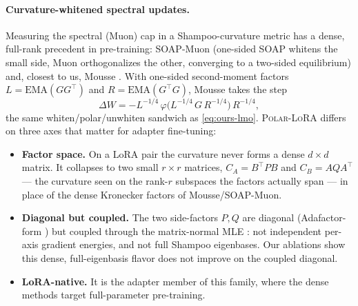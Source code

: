 \documentclass[11pt]{article}
\newcommand{\DW}{\Delta W}
\newcommand{\polar}{\varphi}                 %
\newcommand{\methodname}{\textsc{Polar-LoRA}\xspace}
\theoremstyle{plain}
\theoremstyle{definition}
\theoremstyle{remark}
\begin{document}
\paragraph{Curvature-whitened spectral updates.} Measuring the spectral (Muon) cap in a Shampoo-curvature metric has a dense, full-rank precedent in pre-training: SOAP-Muon \cite{soapmuon} (one-sided SOAP whitens the small side, Muon orthogonalizes the other, converging to a two-sided equilibrium) and, closest to us, Mousse \cite{mousse}. With one-sided second-moment factors $L=\mathrm{EMA}(GG^\top)$ and $R=\mathrm{EMA}(G^\top G)$, Mousse takes the step
\begin{equation*}
  \DW=-L^{-1/4}\,\polar\!\big(L^{-1/4}\,G\,R^{-1/4}\big)\,R^{-1/4},
\end{equation*}
the same whiten/polar/unwhiten sandwich as \eqref{eq:ours-lmo}. \methodname{} differs on three axes that matter for adapter fine-tuning:
\begin{itemize}[leftmargin=1.5em,itemsep=1pt,topsep=2pt]
  \item \textbf{Factor space.} On a LoRA pair the curvature never forms a dense $d\times d$ matrix. It collapses to two small $r\times r$ matrices, $C_A=B^\top PB$ and $C_B=AQA^\top$ --- the curvature seen on the rank-$r$ subspaces the factors actually span --- in place of the dense Kronecker factors of Mousse/SOAP-Muon.
  \item \textbf{Diagonal but coupled.} The two side-factors $P,Q$ are diagonal (Adafactor-form \cite{adafactor}) but coupled through the matrix-normal MLE \cite{klshampoo}: not independent per-axis gradient energies, and not full Shampoo eigenbases. Our ablations show this dense, full-eigenbasis flavor does not improve on the coupled diagonal.
  \item \textbf{LoRA-native.} It is the adapter member of this family, where the dense methods target full-parameter pre-training.
\end{itemize}
\end{document}
